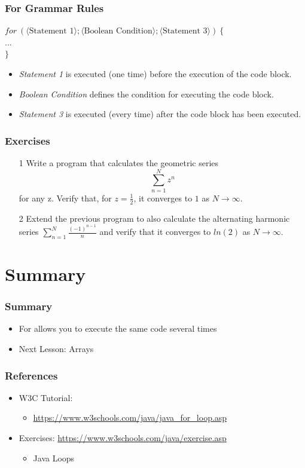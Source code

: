 \documentclass{beamer}
\newcommand{\cindent}{\hskip20pt}
\begin{document}
	\begin{frame}
		\frametitle{For Grammar Rules}
		$for\ (\langle \text{Statement 1} \rangle; \langle \text{Boolean Condition} \rangle; \langle \text{Statement 3} \rangle)\ \{$\\
			\cindent $...$\\
		$\}$\\
		\begin{itemize}
			\item \emph{Statement 1} is executed (one time) before the execution of the code block.
			\item \emph{Boolean Condition} defines the condition for executing the code block.
			\item \emph{Statement 3} is executed (every time) after the code block has been executed.
		\end{itemize}
	\end{frame}

	\begin{frame}
		\frametitle{Exercises}
		\begin{enumerate}
			\item[1] Write a program that calculates the geometric series \[\sum_{n=1}^{N}{z^n}\] for any z. Verify that, for $z=\frac{1}{2}$, it converges to $1$ as $N \to \infty$.
			\pause
			\item[2] Extend the previous program to also calculate the alternating harmonic series $ \sum_{n=1}^{N}{\frac{(-1)^{n-1}}{n}}$ and verify that it converges to $ln(2)$ as $N \to \infty$.
		\end{enumerate}
	\end{frame}

	\section{Summary}
	
	\begin{frame}
		\frametitle{Summary}
		\begin{itemize}
			\item For allows you to execute the same code several times
			\item Next Lesson: Arrays
		\end{itemize}
	\end{frame}

	\begin{frame}
		\frametitle{References}
		\begin{itemize}
			\item W3C Tutorial: 
			\begin{itemize}
				\item \url{https://www.w3schools.com/java/java_for_loop.asp}
			\end{itemize}
			\item Exercises: \url{https://www.w3schools.com/java/exercise.asp}
			\begin{itemize}
				\item Java Loops
			\end{itemize}
		\end{itemize}
		
	\end{frame}
\end{document}
